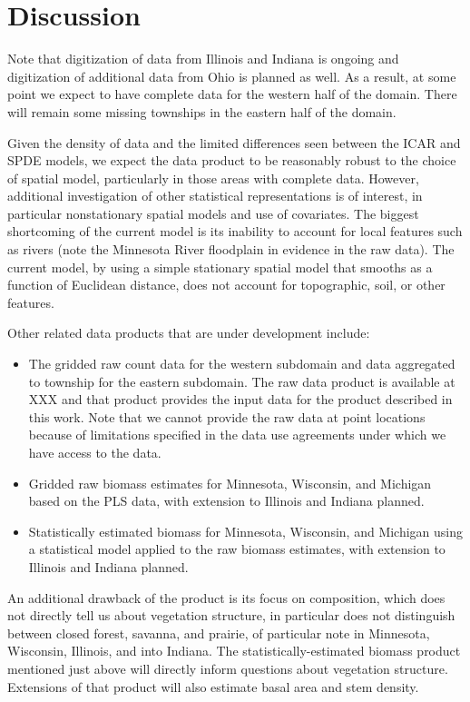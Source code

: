 \documentclass[12pt]{article}\usepackage[]{graphicx}\usepackage[]{color}
\begin{document}
\section{Discussion}

Note that digitization of data from Illinois and Indiana is ongoing
and digitization of additional data from Ohio is planned as well.
As a result, at some point we expect to have complete data for the
western half of the domain. There will remain some missing townships
in the eastern half of the domain. 

Given the density of data and the limited differences seen between
the ICAR and SPDE models, we expect the data product to be reasonably
robust to the choice of spatial model, particularly in those areas
with complete data. However, additional investigation of other statistical
representations is of interest, in particular nonstationary spatial
models and use of covariates. The biggest shortcoming of the current
model is its inability to account for local features such as rivers
(note the Minnesota River floodplain in evidence in the raw data).
The current model, by using a simple stationary spatial model that
smooths as a function of Euclidean distance, does not account for
topographic, soil, or other features. 

Other related data products that are under development include:
\begin{itemize}
\item The gridded raw count data for the western subdomain and data aggregated
to township for the eastern subdomain. The raw data product is available
at XXX and that product provides the input data for the product described
in this work. Note that we cannot provide the raw data at point locations
because of limitations specified in the data use agreements under
which we have access to the data.
\item Gridded raw biomass estimates for Minnesota, Wisconsin, and Michigan
based on the PLS data, with extension to Illinois and Indiana planned.
\item Statistically estimated biomass for Minnesota, Wisconsin, and Michigan
using a statistical model applied to the raw biomass estimates, with
extension to Illinois and Indiana planned.
\end{itemize}
An additional drawback of the product is its focus on composition,
which does not directly tell us about vegetation structure, in particular
does not distinguish between closed forest, savanna, and prairie,
of particular note in Minnesota, Wisconsin, Illinois, and into Indiana.
The statistically-estimated biomass product mentioned just above will
directly inform questions about vegetation structure. Extensions of
that product will also estimate basal area and stem density. 
\end{document}
